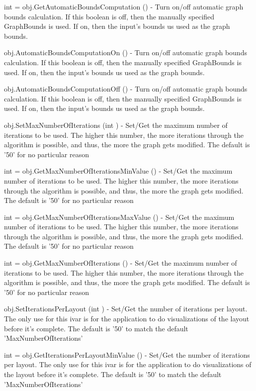 \begin{DoxyItemize}
\item {\ttfamily int = obj.\-Get\-Automatic\-Bounds\-Computation ()} -\/ Turn on/off automatic graph bounds calculation. If this boolean is off, then the manually specified Graph\-Bounds is used. If on, then the input's bounds us used as the graph bounds.  
\item {\ttfamily obj.\-Automatic\-Bounds\-Computation\-On ()} -\/ Turn on/off automatic graph bounds calculation. If this boolean is off, then the manually specified Graph\-Bounds is used. If on, then the input's bounds us used as the graph bounds.  
\item {\ttfamily obj.\-Automatic\-Bounds\-Computation\-Off ()} -\/ Turn on/off automatic graph bounds calculation. If this boolean is off, then the manually specified Graph\-Bounds is used. If on, then the input's bounds us used as the graph bounds.  
\item {\ttfamily obj.\-Set\-Max\-Number\-Of\-Iterations (int )} -\/ Set/\-Get the maximum number of iterations to be used. The higher this number, the more iterations through the algorithm is possible, and thus, the more the graph gets modified. The default is '50' for no particular reason  
\item {\ttfamily int = obj.\-Get\-Max\-Number\-Of\-Iterations\-Min\-Value ()} -\/ Set/\-Get the maximum number of iterations to be used. The higher this number, the more iterations through the algorithm is possible, and thus, the more the graph gets modified. The default is '50' for no particular reason  
\item {\ttfamily int = obj.\-Get\-Max\-Number\-Of\-Iterations\-Max\-Value ()} -\/ Set/\-Get the maximum number of iterations to be used. The higher this number, the more iterations through the algorithm is possible, and thus, the more the graph gets modified. The default is '50' for no particular reason  
\item {\ttfamily int = obj.\-Get\-Max\-Number\-Of\-Iterations ()} -\/ Set/\-Get the maximum number of iterations to be used. The higher this number, the more iterations through the algorithm is possible, and thus, the more the graph gets modified. The default is '50' for no particular reason  
\item {\ttfamily obj.\-Set\-Iterations\-Per\-Layout (int )} -\/ Set/\-Get the number of iterations per layout. The only use for this ivar is for the application to do visualizations of the layout before it's complete. The default is '50' to match the default 'Max\-Number\-Of\-Iterations'  
\item {\ttfamily int = obj.\-Get\-Iterations\-Per\-Layout\-Min\-Value ()} -\/ Set/\-Get the number of iterations per layout. The only use for this ivar is for the application to do visualizations of the layout before it's complete. The default is '50' to match the default 'Max\-Number\-Of\-Iterations'  

\end{DoxyItemize}
